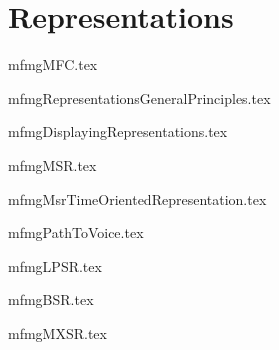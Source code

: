 



\part{Representations}

{mfmgMFC.tex}

{mfmgRepresentationsGeneralPrinciples.tex}

{mfmgDisplayingRepresentations.tex}

{mfmgMSR.tex}

{mfmgMsrTimeOrientedRepresentation.tex}

{mfmgPathToVoice.tex}

{mfmgLPSR.tex}

{mfmgBSR.tex}

{mfmgMXSR.tex}
